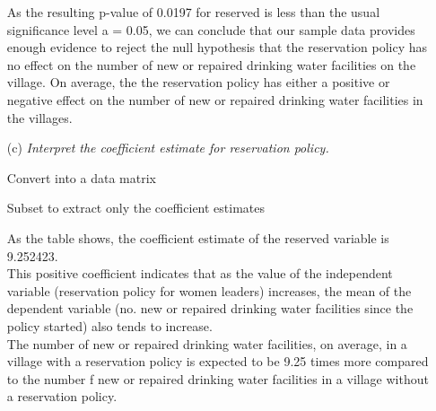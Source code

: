 \documentclass[12pt,letterpaper]{article}
\begin{document}
\begin{enumerate}
		\noindent As the resulting p-value of 0.0197 for reserved is less than the usual significance level a = 0.05, we can conclude that our sample data provides enough evidence to reject the null hypothesis that the reservation policy has no effect on the number of new or repaired drinking water facilities on the village. On average, the the reservation policy has either a positive or negative effect on the  number of new or repaired drinking water facilities in the villages.
		
		
		
		\vspace{.5cm}
		\item [(c)] \emph{Interpret the coefficient estimate for reservation policy. }
		
		\noindent Convert into a data matrix
		
		
		
		\noindent Subset to extract only the coefficient estimates 
		
		
		
		\noindent As the table shows, the coefficient estimate of the reserved variable is 9.252423. \\
		This positive coefficient indicates that as the value of the independent 
		variable (reservation policy for women leaders) increases, the mean of the 
		dependent variable (no. new or repaired drinking water facilities since the policy started) also tends to increase. \\
		
		The number of new or repaired drinking water facilities, on average, in a 
		village with a reservation policy is expected to be 9.25 times more
		compared to the number f new or repaired drinking water facilities in a 
		village without a reservation policy.
		
		
	\end{enumerate}
	
\end{document}
